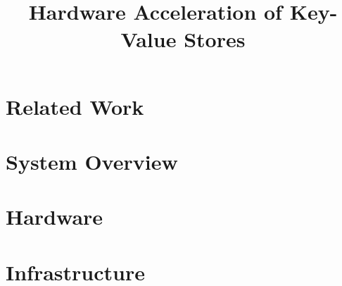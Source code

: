 \documentclass[conference]{IEEEtran}
\title{Hardware Acceleration of Key-Value Stores}
\author{
	\IEEEauthorblockN{Howard Mao}
	\IEEEauthorblockA{\email{zhemao@eecs.berkeley.edu}}
	\and
	\IEEEauthorblockN{Sagar Karandikar}
	\IEEEauthorblockA{\email{skarandikar@berkeley.edu}}
	\and
	\IEEEauthorblockN{Albert Ou}
	\IEEEauthorblockA{\email{aou@eecs.berkeley.edu}}
	\and
	\IEEEauthorblockN{Soumya Basu}
	\IEEEauthorblockA{\email{soumyab@berkeley.edu}}
}
\begin{document}
\maketitle




\section{Related Work}



\section{System Overview}



\section{Hardware}




\section{Infrastructure}




\nocite{*}
\printbibliography
\end{document}
